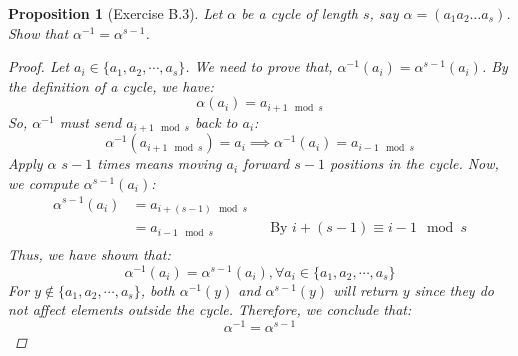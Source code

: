 \documentclass[12pt]{article}
\newtheorem{proposition}{Proposition}
\begin{document}
\begin{proposition}[Exercise B.3]
  Let $\alpha$ be a cycle of length $s$, say $\alpha = (a_1 a_2 \ldots a_s)$.
  Show that $\alpha^{-1} = \alpha^{s-1}$.
  \begin{proof}
    Let $a_i \in \{a_1, a_2, \cdots , a_s\}$.
    We need to prove that, $\alpha^{-1}(a_i) = \alpha^{s-1}(a_i)$.
    By the definition of a cycle, we have:
    \[
      \alpha(a_i) = a_{i + 1 \mod s}
    \]
    So, $\alpha^{-1}$ must send $a_{i + 1 \mod s}$ back to $a_i$:
    \[
      \alpha^{-1}(a_{i + 1 \mod s}) = a_i \implies \alpha^{-1}(a_i) = a_{i - 1 \mod s}
    \]
    Apply $\alpha$ $s - 1$ times means moving $a_i$ forward $s - 1$ positions in the cycle.
    Now, we compute $\alpha^{s-1}(a_i)$:
    \begin{align*}
      \alpha^{s-1}(a_i) & = a_{i + (s - 1) \mod s} &  &                                            \\
                        & = a_{i - 1 \mod s}       &  & \text{By } i + (s - 1) \equiv i - 1 \mod s \\
    \end{align*}
    Thus, we have shown that:
    \[
      \alpha^{-1}(a_i) = \alpha^{s-1}(a_i), \forall a_i \in \{a_1, a_2, \cdots , a_s\}
    \]
    For $y \notin \{a_1, a_2, \cdots, a_s\}$, both $\alpha^{-1}(y)$ and $\alpha^{s-1}(y)$ will return $y$ since they do not affect elements outside the cycle.
    Therefore, we conclude that:
    \[
      \alpha^{-1} = \alpha^{s-1}
    \]
  \end{proof}
\end{proposition}
\end{document}
